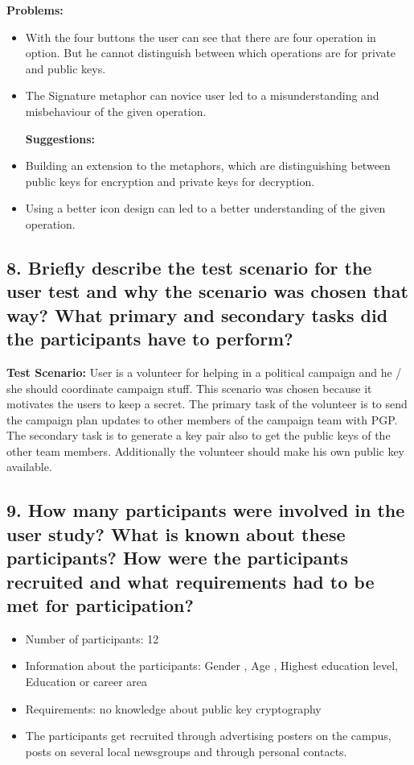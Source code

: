 \textbf{Problems:}
\begin{itemize}
	\item With the four buttons the user can see that there are four operation in option. But he cannot distinguish between which operations are for private and public keys. 

	\item The Signature metaphor can novice user led to a misunderstanding and misbehaviour of the given operation. 

\textbf{Suggestions:}
	\item Building an extension to the metaphors, which are distinguishing between public keys for encryption and private keys for decryption.

	\item Using a better icon design can led to a better understanding of the given operation. 

\end{itemize}

\subsection{8. Briefly describe the test scenario for the user test and why the scenario was chosen that way? What primary and secondary tasks did the participants have to perform? }

\textbf{Test Scenario:}
 User is a volunteer for helping in a political campaign and  he / she should coordinate campaign stuff. This scenario was chosen because it motivates the users to keep a secret. 
The primary task of the volunteer is to send the campaign plan updates to other members of the campaign team with PGP. 
The secondary task is to generate a key pair also to get the public keys of the other team members. Additionally the volunteer should make his own public key available. 


\subsection{9. How many participants were involved in the user study? What is known about these participants? How were the participants recruited and what requirements had to be met for participation? }
\begin{itemize}
	\item Number of participants: 12
	\item Information about the participants: Gender , Age , Highest education level, Education or career area
	\item Requirements: no knowledge about public key cryptography 
	\item The participants get recruited through advertising posters on the campus, posts on several local newsgroups and through personal contacts. 
\end{itemize}

